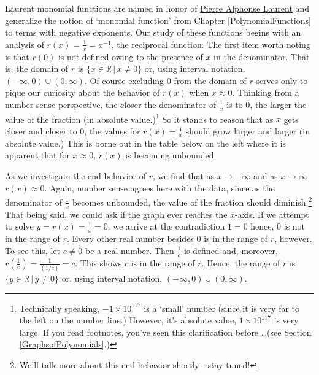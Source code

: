 Laurent monomial functions are named in honor of \href{https://en.wikipedia.org/wiki/Pierre_Alphonse_Laurent}{\underline{Pierre Alphonse Laurent}} and generalize the notion of `monomial function' from Chapter \ref{PolynomialFunctions} to terms with negative exponents. Our study of these functions begins with an analysis of   $r(x) = \frac{1}{x} = x^{-1}$, the reciprocal function. The first item worth  noting is that $r(0)$ is not defined owing to the presence of $x$  in the denominator.  That is, the domain of $r$ is $\{ x \in \mathbb{R} \, | \, x \neq 0\}$ or, using interval notation, $(-\infty, 0) \cup (0, \infty)$.   Of course excluding $0$ from the domain of $r$ serves only to pique our curiosity about the behavior of $r(x)$ when $x \approx 0$.  Thinking from a number sense perspective, the closer the denominator of $\frac{1}{x}$ is to $0$, the larger the value of the  fraction (in absolute value.)\footnote{Technically speaking, $-1 \times 10^{117}$ is a `small' number (since it is very far to the left on the number line.)  However, it's absolute value, $1 \times 10^{117}$ is very large.  If you read footnotes, you've seen this clarification before \ldots (see Section \ref{GraphsofPolynomials}.)}  So it stands to reason that as $x$ gets closer and closer to $0$, the values for $r(x) = \frac{1}{x}$ should grow larger and larger (in absolute value.)  This is borne out in the table below on the left where it is apparent that for $x \approx 0$, $r(x)$ is becoming unbounded.



As we investigate the end behavior of $r$, we find that as $x \rightarrow -\infty$ and as $x \rightarrow \infty$, $r(x) \approx 0$. Again, number sense agrees here with the data, since as the denominator of $\frac{1}{x}$ becomes unbounded, the value of the fraction should diminish.\footnote{We'll talk more about this end behavior shortly - stay tuned!} That being said, we could ask if the graph ever reaches the $x$-axis.  If we attempt to solve $y = r(x) = \frac{1}{x} = 0$. we arrive at the contradiction $1 = 0$ hence, $0$ is not in the range of $r$.  Every other real number besides $0$ is in the range of $r$, however.  To see this, let $c \neq 0$ be a real number.  Then $\frac{1}{c}$ is defined and, moreover, $r \left(\frac{1}{c} \right) = \frac{1}{(1/c)} = c$.  This shows $c$ is in the range of $r$.  Hence, the range of $r$ is $\{ y \in \mathbb{R} \, | \, y \neq 0\}$ or, using interval notation,  $(-\infty, 0) \cup (0, \infty)$.  

